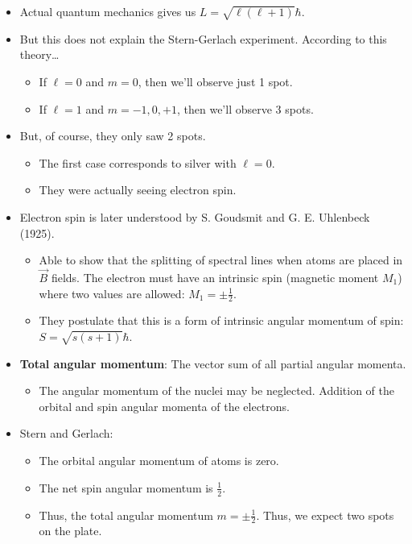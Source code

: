 \documentclass[../notes.tex]{subfiles}
\begin{document}
\begin{itemize}
    \item Actual quantum mechanics gives us $L=\sqrt{\ell(\ell+1)}\hbar$.
    \item But this does not explain the Stern-Gerlach experiment. According to this theory\dots
    \begin{itemize}
        \item If $\ell=0$ and $m=0$, then we'll observe just 1 spot.
        \item If $\ell=1$ and $m=-1,0,+1$, then we'll observe 3 spots.
    \end{itemize}
    \item But, of course, they only saw 2 spots.
    \begin{itemize}
        \item The first case corresponds to silver with $\ell=0$.
        \item They were actually seeing electron spin.
    \end{itemize}
    \item Electron spin is later understood by S. Goudsmit and G. E. Uhlenbeck (1925).
    \begin{itemize}
        \item Able to show that the splitting of spectral lines when atoms are placed in $\vec{B}$ fields. The electron must have an intrinsic spin (magnetic moment $M_1$) where two values are allowed: $M_1=\pm\frac{1}{2}$.
        \item They postulate that this is a form of intrinsic angular momentum of spin: $S=\sqrt{s(s+1)}\hbar$.
    \end{itemize}
    \item \textbf{Total angular momentum}: The vector sum of all partial angular momenta.
    \begin{itemize}
        \item The angular momentum of the nuclei may be neglected. Addition of the orbital and spin angular momenta of the electrons.
    \end{itemize}
    \item Stern and Gerlach:
    \begin{itemize}
        \item The orbital angular momentum of  atoms is zero.
        \item The net spin angular momentum is $\frac{1}{2}$.
        \item Thus, the total angular momentum $m=\pm\frac{1}{2}$. Thus, we expect two spots on the plate.
    \end{itemize}

\end{itemize}
\end{document}
